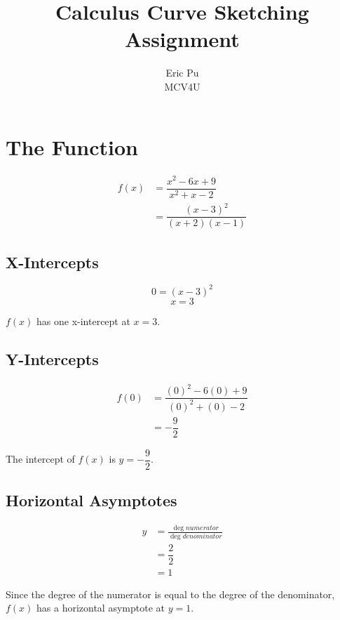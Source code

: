 \documentclass[12pt]{article}
\title{Calculus Curve Sketching Assignment} %
\author{Eric Pu\\ %
MCV4U\\ %
}
\begin{document}
\setlength{\droptitle}{-5em}    
\maketitle


\section*{The Function}

\begin{align*}
f(x) & = \dfrac{x^2-6x+9}{x^2+x-2} \\& = \dfrac{(x-3)^2}{(x+2)(x-1)}
\end{align*}


\subsection*{X-Intercepts}

{\bfseries \[0 = (x-3)^2\] \n \[x=3\]}

$f(x)$ has one x-intercept at $x = 3$.


\subsection*{Y-Intercepts}

\begin{align*}
f(0) &= \dfrac{(0)^2-6(0)+9}{(0)^2+(0)-2} \\&= -\dfrac{9}{2}
\end{align*}

The intercept of $f(x)$ is $y = -\dfrac{9}{2}$.

\subsection*{Horizontal Asymptotes}

\begin{align*}
y &= \frac{\deg{numerator}}{\deg{denominator}} \\&= \dfrac{2}{2} \\&=1
\end{align*}

Since the degree of the numerator is equal to the degree of the denominator, $f(x)$ has a horizontal asymptote at $y = 1$.
\end{document}
